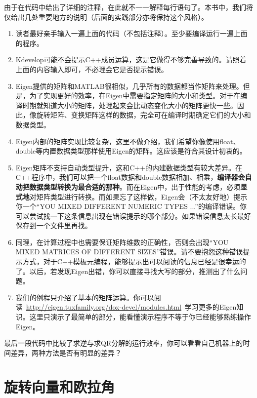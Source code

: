 由于在代码中给出了详细的注释，在此就不一一解释每行语句了。本书中，我们将仅给出几处重要地方的说明（后面的实践部分亦将保持这个风格）。

\begin{enumerate}
	\item 读者最好亲手输入一遍上面的代码（不包括注释）。至少要编译运行一遍上面的程序。
	
	\item Kdevelop可能不会提示C++成员运算，这是它做得不够完善导致的。请照着上面的内容输入即可，不必理会它是否提示错误。
	
	\item Eigen提供的矩阵和MATLAB很相似，几乎所有的数据都当作矩阵来处理。但是，为了实现更好的效率，在Eigen中需要指定矩阵的大小和类型。对于在编译时期就知道大小的矩阵，处理起来会比动态变化大小的矩阵更快一些。因此，像旋转矩阵、变换矩阵这样的数据，完全可在编译时期确定它们的大小和数据类型。
	
	\item Eigen内部的矩阵实现比较复杂，这里不做介绍，我们希望你像使用float、double等内置数据类型那样使用Eigen的矩阵。这应该是符合其设计初衷的。
	
	\item Eigen矩阵不支持自动类型提升，这和C++的内建数据类型有较大差异。在C++程序中，我们可以把一个float数据和double数据相加、相乘，\textbf{编译器会自动把数据类型转换为最合适的那种}。而在Eigen中，出于性能的考虑，必须\textbf{显式地}对矩阵类型进行转换。而如果忘了这样做，Eigen会（不太友好地）提示你一个“YOU MIXED DIFFERENT NUMERIC TYPES ...”的编译错误。你可以尝试找一下这条信息出现在错误提示的哪个部分。如果错误信息太长最好保存到一个文件里再找。
	
	\item 同理，在计算过程中也需要保证矩阵维数的正确性，否则会出现“YOU MIXED MATRICES OF DIFFERENT SIZES”错误。请不要抱怨这种错误提示方式，对于C++模板元编程，能够提示出可以阅读的信息已经是很幸运的了。以后，若发现Eigen出错，你可以直接寻找大写的部分，推测出了什么问题。
	
	\item 我们的例程只介绍了基本的矩阵运算。你可以阅读~\url{http://eigen.tuxfamily.org/dox-devel/modules.html}~学习更多的Eigen知识。这里只演示了最简单的部分，能看懂演示程序不等于你已经能够熟练操作Eigen。
\end{enumerate}

最后一段代码中比较了求逆与求QR分解的运行效率，你可以看看自己机器上的时间差异，两种方法是否有明显的差异？

\section{旋转向量和欧拉角}
